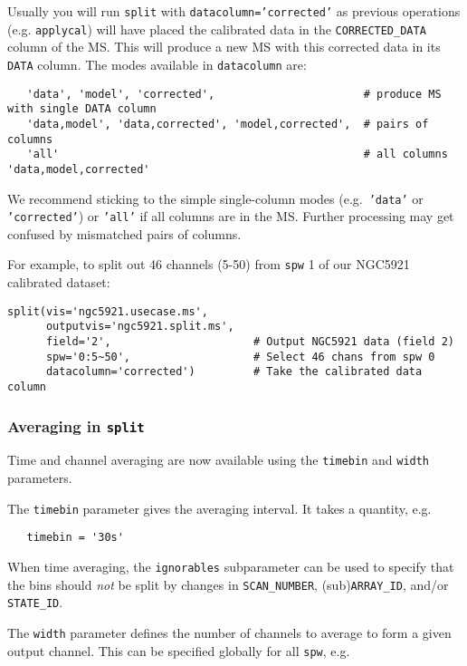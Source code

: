 Usually you will run {\tt split} with {\tt datacolumn='corrected'} as
previous operations (e.g. {\tt applycal}) will have placed the
calibrated data in the {\tt CORRECTED\_DATA} column of the MS.  This
will produce a new MS with this corrected data in its {\tt DATA} 
column.  The modes available in {\tt datacolumn} are:
\small
\begin{verbatim}
   'data', 'model', 'corrected',                       # produce MS with single DATA column
   'data,model', 'data,corrected', 'model,corrected',  # pairs of columns
   'all'                                               # all columns 'data,model,corrected'
\end{verbatim}
\normalsize
We recommend sticking to the simple single-column modes (e.g.\ 
{\tt 'data'} or {\tt 'corrected'}) or {\tt 'all'} if all columns are in
the MS.  Further processing may get confused by mismatched pairs of columns.

For example, to split out 46 channels (5-50) from {\tt spw} 1 of
our NGC5921 calibrated dataset:
\small
\begin{verbatim}
split(vis='ngc5921.usecase.ms',       
      outputvis='ngc5921.split.ms',    
      field='2',                      # Output NGC5921 data (field 2)
      spw='0:5~50',                   # Select 46 chans from spw 0
      datacolumn='corrected')         # Take the calibrated data column
\end{verbatim}
\normalsize

\subsubsection{Averaging in {\tt split}}
\label{section:cal.other.split.average}

Time and channel averaging are now available using the {\tt timebin}
and {\tt width} parameters.

The {\tt timebin} parameter gives the averaging interval.  It takes a
quantity, e.g.
\small
\begin{verbatim}
   timebin = '30s'
\end{verbatim}
\normalsize

When time averaging, the {\tt ignorables} subparameter can be used to
specify that the bins should \emph{not} be split by changes in
{\tt SCAN\_NUMBER}, (sub){\tt ARRAY\_ID}, and/or {\tt STATE\_ID}.


The {\tt width} parameter defines the number of channels to average to
form a given output channel.  This can be specified globally for all
{\tt spw}, e.g.

